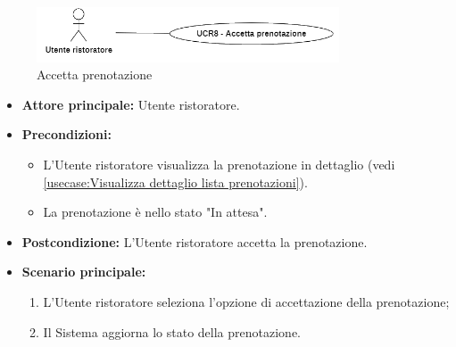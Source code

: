\label{usecase:Accetta prenotazione}

\begin{figure}[h]
	\centering
	\includegraphics[width=0.8\textwidth]{./uml/UCR8.png} 
	\caption{Accetta prenotazione}
	\label{fig:UCR8}
  \end{figure}

\begin{itemize}
	\item \textbf{Attore principale:} Utente ristoratore.

	\item \textbf{Precondizioni:}
	      \begin{itemize}
		      \item L'Utente ristoratore visualizza la prenotazione in dettaglio (vedi \autoref{usecase:Visualizza dettaglio lista prenotazioni}).

		      \item La prenotazione è nello stato "In attesa".
	      \end{itemize}

	\item \textbf{Postcondizione:} L'Utente ristoratore accetta la prenotazione.


	\item \textbf{Scenario principale:}
	      \begin{enumerate}
		      \item L'Utente ristoratore seleziona l'opzione di accettazione della prenotazione;

		      \item Il Sistema aggiorna lo stato della prenotazione.
	      \end{enumerate}
\end{itemize}
